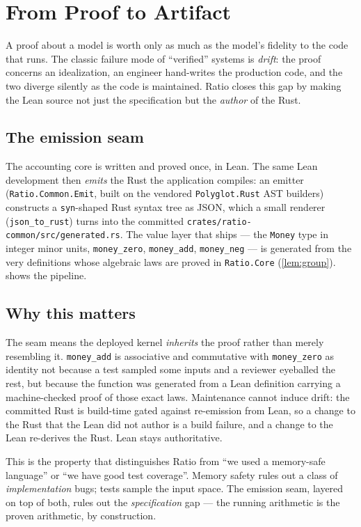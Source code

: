 \section{From Proof to Artifact}
\label{sec:emission}

A proof about a model is worth only as much as the model's fidelity to
the code that runs. The classic failure mode of ``verified'' systems is
\emph{drift}: the proof concerns an idealization, an engineer hand-writes
the production code, and the two diverge silently as the code is
maintained. Ratio closes this gap by making the Lean source not just the
specification but the \emph{author} of the Rust.

\subsection{The emission seam}

The accounting core is written and proved once, in Lean. The same Lean
development then \emph{emits} the Rust the application compiles: an
emitter (\texttt{Ratio.Common.Emit}, built on the vendored
\texttt{Polyglot.Rust} AST builders) constructs a \texttt{syn}-shaped
Rust syntax tree as JSON, which a small renderer (\texttt{json\_to\_rust})
turns into the committed \texttt{crates/ratio-common/src/generated.rs}.
The value layer that ships --- the \texttt{Money} type in integer minor
units, \texttt{money\_zero}, \texttt{money\_add}, \texttt{money\_neg} ---
is generated from the very definitions whose algebraic laws are proved in
\texttt{Ratio.Core} (\cref{lem:group}).  shows the
pipeline.

\subsection{Why this matters}

The seam means the deployed kernel \emph{inherits} the proof rather than
merely resembling it. \texttt{money\_add} is associative and commutative
with \texttt{money\_zero} as identity not because a test sampled some
inputs and a reviewer eyeballed the rest, but because the function was
generated from a Lean definition carrying a machine-checked proof of
those exact laws. Maintenance cannot induce drift: the committed Rust is
build-time gated against re-emission from Lean, so a change to the Rust
that the Lean did not author is a build failure, and a change to the Lean
re-derives the Rust. Lean stays authoritative.

This is the property that distinguishes Ratio from ``we used a memory-safe
language'' or ``we have good test coverage''. Memory safety rules out a
class of \emph{implementation} bugs; tests sample the input space. The
emission seam, layered on top of both, rules out the \emph{specification}
gap --- the running arithmetic is the proven arithmetic, by construction.


